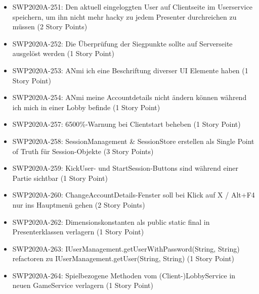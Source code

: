 \documentclass[12pt,a4paper, oneside]{article}
\begin{document}
\begin{itemize}
\item SWP2020A-251:	Den aktuell eingeloggten User auf Clientseite im Userservice speichern, um ihn nicht mehr hacky zu jedem Presenter durchreichen zu müssen (2 Story Points)

\item SWP2020A-252:	Die Überprüfung der Siegpunkte sollte auf Serverseite ausgelöst werden (1 Story Point)

\item SWP2020A-253:	ANmi ich eine Beschriftung diverser UI Elemente haben (1 Story Point)

\item SWP2020A-254:	ANmi meine Accountdetails nicht ändern können während ich mich in einer Lobby befinde (1 Story Point)

\item SWP2020A-257: 6500\%-Warnung bei Clientstart beheben (1 Story Point)

\item SWP2020A-258:	SessionManagement \& SessionStore erstellen als Single Point of Truth für Session-Objekte (3 Story Points)

\item SWP2020A-259:	KickUser- und StartSession-Buttons sind während einer Partie sichtbar (1 Story Point)

\item SWP2020A-260:	ChangeAccountDetails-Fenster soll bei Klick auf X / Alt+F4 nur ins Hauptmenü gehen (2 Story Points)

\item SWP2020A-262:	Dimensionskonstanten als public static final in Presenterklassen verlagern (1 Story Point)

\item SWP2020A-263: IUserManagement.getUserWithPassword(String, String) refactoren zu IUserManagement.getUser(String, String) (1 Story Point)

\item SWP2020A-264: Spielbezogene Methoden vom (Client-)LobbyService in neuen GameService verlagern (1 Story Point)

\end{itemize}

\newpage
\end{document}
